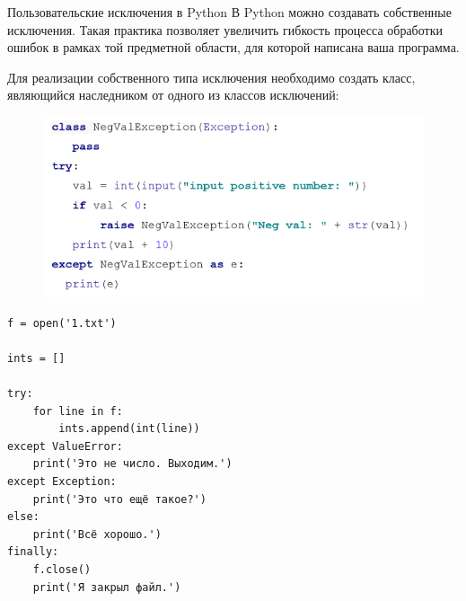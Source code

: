 \documentclass[xcolor=table]{beamer}
\begin{document}
\begin{frame}{Пользовательские исключения в Python}
	В Python можно создавать собственные исключения. Такая практика позволяет увеличить гибкость процесса обработки ошибок в рамках той предметной области, для которой написана ваша программа.

	\medskip

	Для реализации собственного типа исключения необходимо создать класс, являющийся наследником от одного из классов исключений:
	\begin{figure}[h]
		\centering
		\includegraphics[scale=0.7]{images/lec08-pic12-python.png}
	\end{figure}	
\end{frame}

\begin{frame}[fragile]
	\begin{verbatim}
f = open('1.txt')

ints = []

try:
	for line in f:
		ints.append(int(line))
except ValueError:
	print('Это не число. Выходим.')
except Exception:
	print('Это что ещё такое?')
else:
	print('Всё хорошо.')
finally:
	f.close()
	print('Я закрыл файл.')
	\end{verbatim}
\end{frame}
\end{document}
